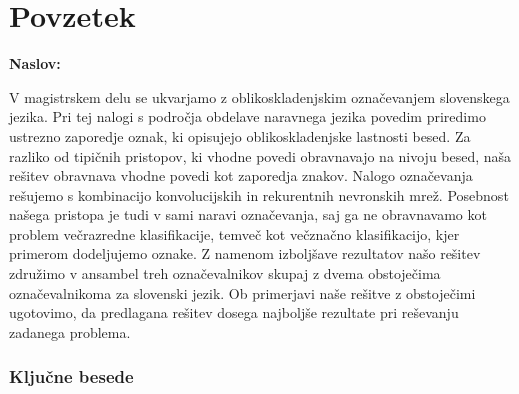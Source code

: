 \chapter*{Povzetek}

\noindent\textbf{Naslov:} \ttitle
\bigskip

V magistrskem delu se ukvarjamo z oblikoskladenjskim označevanjem slovenskega jezika. Pri tej nalogi s področja obdelave naravnega jezika povedim priredimo ustrezno zaporedje oznak, ki opisujejo oblikoskladenjske lastnosti besed. Za razliko od tipičnih pristopov, ki vhodne povedi obravnavajo na nivoju besed, naša rešitev obravnava vhodne povedi kot zaporedja znakov. Nalogo označevanja rešujemo s kombinacijo konvolucijskih in rekurentnih nevronskih mrež. Posebnost našega pristopa je tudi v sami naravi označevanja, saj ga ne obravnavamo kot problem večrazredne klasifikacije, temveč kot večznačno klasifikacijo, kjer primerom dodeljujemo oznake. Z namenom izboljšave rezultatov našo rešitev združimo v ansambel treh označevalnikov skupaj z dvema obstoječima označevalnikoma za slovenski jezik. Ob primerjavi naše rešitve z obstoječimi ugotovimo, da predlagana rešitev dosega najboljše rezultate pri reševanju zadanega problema.

\subsection*{Ključne besede}
\textit{\tkeywords}
\clearemptydoublepage
